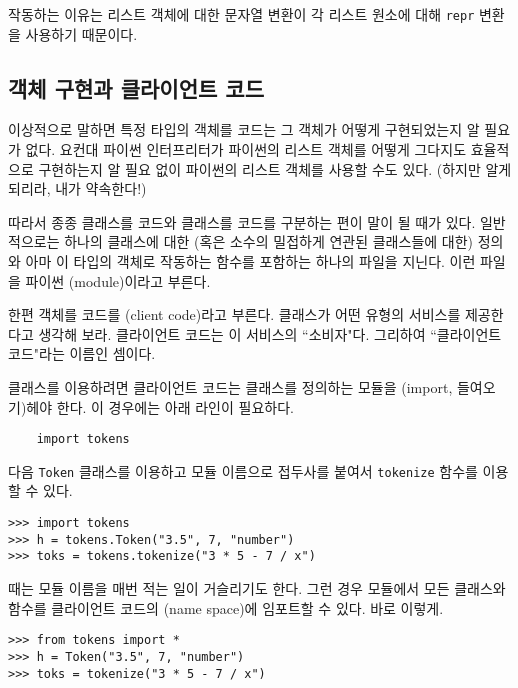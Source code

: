 \documentclass[a4paper]{oblivoir}
\begin{document}
 작동하는 이유는 리스트 객체에 대한 문자열 변환이 각 리스트 원소에 대해 \texttt{repr} 변환을 사용하기 때문이다.

\subsection*{객체 구현과 클라이언트 코드}

이상적으로 말하면 특정 타입의 객체를  코드는 그 객체가 어떻게 구현되었는지 알 필요가 없다. 요컨대 파이썬 인터프리터가 파이썬의 리스트 객체를 어떻게 그다지도 효율적으로 구현하는지 알 필요 없이 파이썬의 리스트 객체를 사용할 수도 있다. (하지만 알게 되리라, 내가 약속한다!)

따라서 종종 클래스를  코드와 클래스를  코드를 구분하는 편이 말이 될 때가 있다. 일반적으로는 하나의 클래스에 대한 (혹은 소수의 밀접하게 연관된 클래스들에 대한) 정의와 아마 이 타입의 객체로 작동하는 함수를 포함하는 하나의 파일을 지닌다. 이런 파일을 파이썬 (module)이라고 부른다.

한편 객체를  코드를 (client code)라고 부른다. 클래스가 어떤 유형의 서비스를 제공한다고 생각해 보라. 클라이언트 코드는 이 서비스의 ``소비자"다. 그리하여 ``클라이언트 코드"라는 이름인 셈이다.

클래스를 이용하려면 클라이언트 코드는 클래스를 정의하는 모듈을 (import, 들여오기)헤야 한다. 이 경우에는 아래 라인이 필요하다.

\begin{verbatim}
    import tokens
\end{verbatim}

 다음 \texttt{Token} 클래스를 이용하고 모듈 이름으로 접두사를 붙여서 \texttt{tokenize} 함수를 이용할 수 있다.

\begin{lstlisting}
>>> import tokens
>>> h = tokens.Token("3.5", 7, "number")
>>> toks = tokens.tokenize("3 * 5 - 7 / x")
\end{lstlisting}

 때는 모듈 이름을 매번 적는 일이 거슬리기도 한다. 그런 경우 모듈에서 모든 클래스와 함수를 클라이언트 코드의 (name space)에 임포트할 수 있다. 바로 이렇게.

\begin{lstlisting}
>>> from tokens import *
>>> h = Token("3.5", 7, "number")
>>> toks = tokenize("3 * 5 - 7 / x")
\end{lstlisting}
\end{document}
